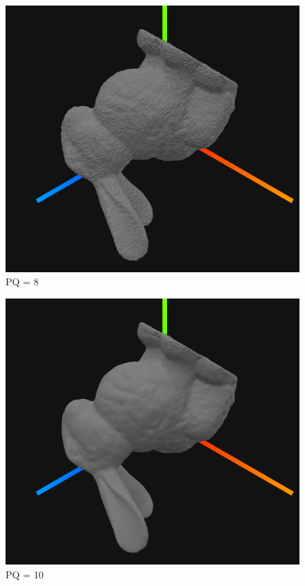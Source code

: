 \documentclass{article}
\begin{document}
\begin{figure}[h!]
\centerline{\includegraphics[scale=0.8]{./rendus/pq8.png}}
\caption{PQ = 8}
\end{figure}

\begin{figure}[h!]
\centerline{\includegraphics[scale=0.8]{./rendus/pq10.png}}
\caption{PQ = 10}
\end{figure}
\end{document}
